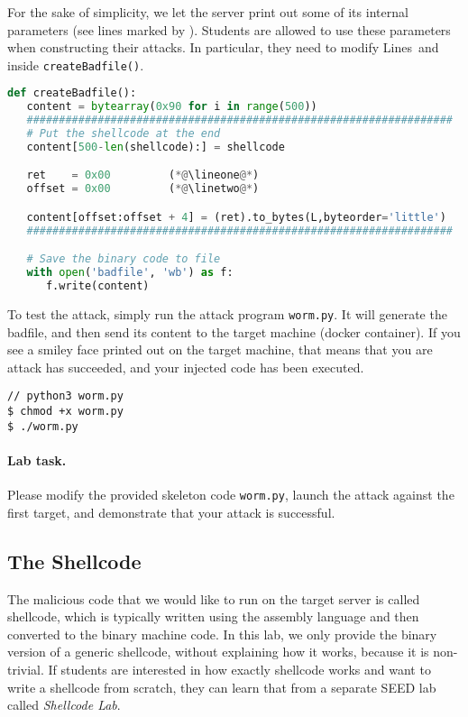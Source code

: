 For the sake of simplicity, we let the server print out some of its 
internal parameters (see lines marked by ). Students 
are allowed to use these parameters when constructing their attacks. 
In particular, they need to modify Lines~\lineone and~\linetwo
inside \texttt{createBadfile()}.  

\begin{lstlisting}[language=Python]
def createBadfile():
   content = bytearray(0x90 for i in range(500))
   ##################################################################
   # Put the shellcode at the end
   content[500-len(shellcode):] = shellcode

   ret    = 0x00         (*@\lineone@*)  
   offset = 0x00         (*@\linetwo@*) 

   content[offset:offset + 4] = (ret).to_bytes(L,byteorder='little')
   ##################################################################

   # Save the binary code to file
   with open('badfile', 'wb') as f:
      f.write(content)
\end{lstlisting}
 

To test the attack, simply run the attack program \texttt{worm.py}.
It will generate the badfile, and then send its content to
the target machine (docker container). If you see a smiley face printed out on the 
target machine, that means that you are attack has succeeded, and your 
injected code has been executed. 


\begin{lstlisting}
// python3 worm.py 
$ chmod +x worm.py
$ ./worm.py
\end{lstlisting}


\paragraph{Lab task.}
Please modify the provided skeleton code \texttt{worm.py}, launch the 
attack against the first target, and demonstrate that your attack is 
successful. 
 

\subsection{The Shellcode} 

The malicious code that we would like to run on the target 
server is called shellcode, which is typically written
using the assembly language and then converted to the 
binary machine code. 
In this lab, we only provide the binary version of a generic shellcode,
without explaining how it works, because it is non-trivial.
If students are interested in how exactly shellcode works and
want to write a shellcode from scratch, they
can learn that from a separate SEED lab called \textit{Shellcode Lab}.

